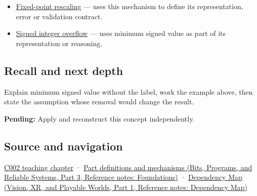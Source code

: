 \hypertarget{appendix-05f39b10364d-used-by}{}

\begin{itemize}
\item
  \hyperref[appendix-3333db47830f]{Fixed-point rescaling} --- uses this mechanism to define its representation, error or validation contract.
\item
  \hyperref[appendix-1a599c924a4e]{Signed integer overflow} --- uses minimum signed value as part of its representation or reasoning.
\end{itemize}

\subsection{Recall and next depth}\label{appendix-05f39b10364d-recall-and-next-depth}

\hypertarget{appendix-05f39b10364d-recall-and-next-depth}{}

Explain minimum signed value without the label, work the example above, then state the assumption whose removal would change the result.

\textbf{Pending:} Apply and reconstruct this concept independently.

\subsection{Source and navigation}\label{appendix-05f39b10364d-source-and-navigation}

\hypertarget{appendix-05f39b10364d-source-and-navigation}{}

\hyperref[01-foundations-i-ch001-arithmetic-becomes-a-policy]{C002 teaching chapter} · \href{../01-Bits-Programs-and-Reliable-Systems-P03/main.pdf\#nameddest=appendix-fd090d982a15}{Part definitions and mechanisms (Bits, Programs, and Reliable Systems, Part 3, Reference notes: Foundations)} · \href{../07-Vision-XR-and-Playable-Worlds-P01/main.pdf\#nameddest=appendix-4ad47bdd269a}{Dependency Map (Vision, XR, and Playable Worlds, Part 1, Reference notes: Dependency Map)}
